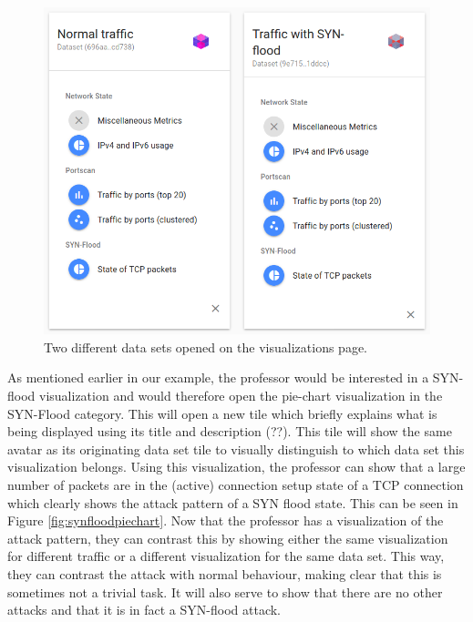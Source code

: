 \begin{figure}
    \centering
    \includegraphics[width=13cm]{images/evaluation-dataset-tiles.png}
    \caption{Two different data sets opened on the visualizations page.}
    \label{fig:datasettiles}
\end{figure}
As mentioned earlier in our example, the professor would be interested in a SYN-flood visualization and would therefore open the pie-chart visualization in the SYN-Flood category. This will open a new tile which briefly explains what is being displayed using its title and description (??). This tile will show the same avatar as its originating data set tile to visually distinguish to which data set this visualization belongs. Using this visualization, the professor can show that a large number of packets are in the (active) connection setup state of a TCP connection which clearly shows the attack pattern of a SYN flood state. This can be seen in Figure \ref{fig:synfloodpiechart}. Now that the professor has a visualization of the attack pattern, they can contrast this by showing either the same visualization for different traffic or a different visualization for the same data set. This way, they can contrast the attack with normal behaviour, making clear that this is sometimes not a trivial task. It will also serve to show that there are no other attacks and that it is in fact a SYN-flood attack.

